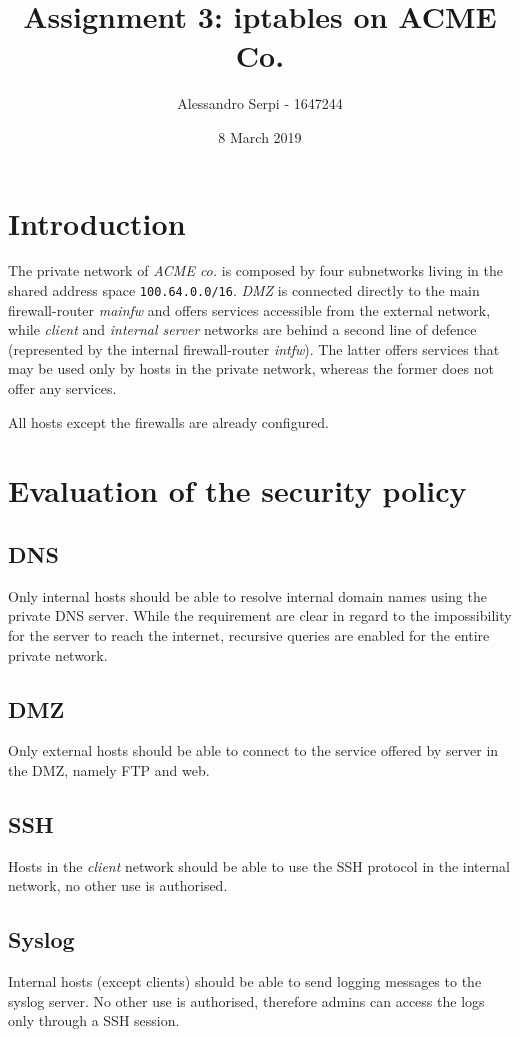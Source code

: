 \documentclass[draft]{homework}
\title{Assignment 3: iptables on ACME Co.}
\author{Alessandro Serpi - 1647244}
\date{8 March 2019}
\newcommand{\client}{\textit{client}\xspace}
\newcommand{\dmz}{\textit{DMZ}\xspace}
\newcommand{\ser}{\textit{internal server}\xspace}
\newcommand{\intfw}{\textit{intfw}\xspace}
\newcommand{\mainfw}{\textit{mainfw}\xspace}
\begin{document}
    \maketitle
    \tableofcontents
    
    \pagebreak
    \section{Introduction}
    The private network of \textit{ACME co.} is composed by four subnetworks living in the shared address space \texttt{100.64.0.0/16}. \dmz is connected directly to the main firewall-router \mainfw and offers services accessible from the external network, while \client and \ser networks are behind a second line of defence (represented by the internal firewall-router \intfw). The latter offers services that may be used only by hosts in the private network, whereas the former does not offer any services.
    
    All hosts except the firewalls are already configured. 
    
    
    \section{Evaluation of the security policy}
    \subsection{DNS}
    Only internal hosts should be able to resolve internal domain names using the private DNS server.
    While the requirement are clear in regard to the impossibility for the server to reach the internet, recursive queries are enabled for the entire private network.
    
    \subsection{DMZ}
    Only external hosts should be able to connect to the service offered by server in the DMZ, namely FTP and web.
    
    \subsection{SSH}
    Hosts in the \client network should be able to use the SSH protocol in the internal network, no other use is authorised.
    
    \subsection{Syslog}
    Internal hosts (except clients) should be able to send logging messages to the syslog server.
    No other use is authorised, therefore admins can access the logs only through a SSH session.
\end{document}
